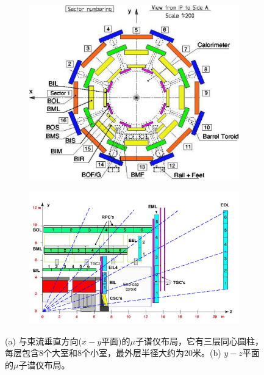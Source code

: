 \begin{figure}[h]
\begin{center}
 \begin{subfigure}[b]{0.45\textwidth}
      \includegraphics[width=\textwidth]{fig/Muon_sector_numbering.pdf}
      \caption{}
      \label{fig:muon_xy}
  \end{subfigure}
 \begin{subfigure}[b]{0.45\textwidth}
      \includegraphics[width=\textwidth]{fig/Muon_rz_large_sect_6.pdf}
      \caption{}
      \label{fig:muon_rz}
  \end{subfigure}
\caption{(a) 与束流垂直方向($x-y$平面)的$\mu$子谱仪布局，它有三层同心圆柱，每层包含8个大室和8个小室，最外层半径大约为20米。(b) $y-z$平面的$\mu$子谱仪布局。}
\label{fig:muon_overview}
\end{center}
\end{figure}

